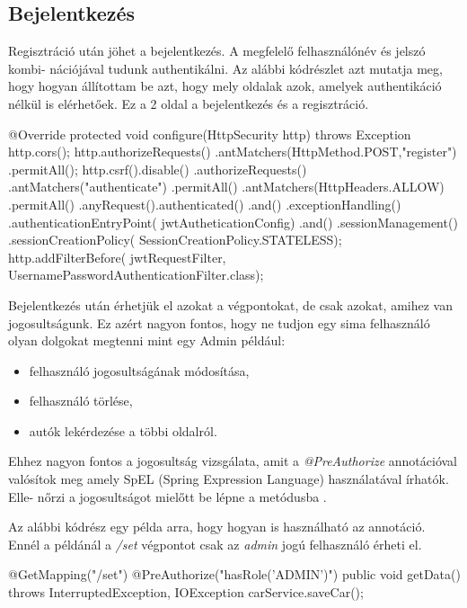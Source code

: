 \subsection{Bejelentkezés}

Regisztráció után jöhet a bejelentkezés. A megfelelő felhasználónév és jelszó kombi-
nációjával tudunk authentikálni. Az alábbi kódrészlet azt mutatja meg, hogy hogyan állítottam be azt, hogy mely oldalak azok, amelyek authentikáció nélkül is elérhetőek. Ez a 2 oldal a bejelentkezés és a regisztráció.

\begin{java}
@Override
protected void configure(HttpSecurity http)
 throws Exception {
    http.cors();
    http.authorizeRequests()
      .antMatchers(HttpMethod.POST,"register")
      .permitAll();
    http.csrf().disable()
      .authorizeRequests()
      .antMatchers("authenticate")
      .permitAll()
      .antMatchers(HttpHeaders.ALLOW)
      .permitAll()
      .anyRequest().authenticated()
      .and()
      .exceptionHandling()
      .authenticationEntryPoint(
       jwtAutheticationConfig)
      .and()
      .sessionManagement()
      .sessionCreationPolicy(
      SessionCreationPolicy.STATELESS);
    http.addFilterBefore(
    jwtRequestFilter,
    UsernamePasswordAuthenticationFilter.class);
}
\end{java}

Bejelentkezés után érhetjük el azokat a végpontokat, de csak azokat, amihez van jogosultságunk. Ez azért nagyon fontos, hogy ne tudjon egy sima felhasználó olyan dolgokat megtenni mint egy Admin például:

\begin{itemize}
\item felhasználó jogosultságának módosítása,
\item felhasználó törlése,
\item autók lekérdezése a többi oldalról.
\end{itemize}

Ehhez nagyon fontos a jogosultság vizsgálata, amit a \textit{@PreAuthorize} annotációval valósítok meg amely SpEL (Spring Expression Language) használatával írhatók. Elle-
nőrzi a jogosultságot mielőtt be lépne a metódusba \cite{SpringSecurity}.

Az alábbi kódrész egy példa arra, hogy hogyan is használható az annotáció. Ennél a példánál a \textit{/set} végpontot csak az \textit{admin} jogú felhasználó érheti el.

\begin{java}
@GetMapping("/set")
@PreAuthorize("hasRole('ADMIN')")
public void getData() throws InterruptedException,
IOException {
   carService.saveCar();
}
\end{java}
\newpage

